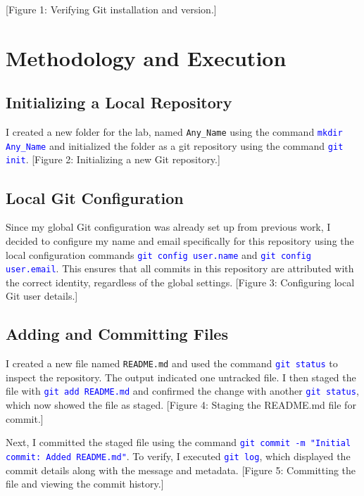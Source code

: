 \documentclass[10pt,a4paper]{report}
\newcommand{\command}[1]{\texttt{\textcolor{blue}{#1}}}
\begin{document}
[Figure 1: Verifying Git installation and version.]

\newpage
\section{Methodology and Execution}

\subsection{Initializing a Local Repository}
I created a new folder for the lab, named \texttt{Any\_Name} using the command \command{mkdir Any\_Name} and initialized the folder as a git repository using the command \command{git init}.
[Figure 2: Initializing a new Git repository.]


\subsection{Local Git Configuration}
Since my global Git configuration was already set up from previous work, I decided to configure my name and email specifically for this repository using the local configuration commands \command{git config user.name} and \command{git config user.email}. This ensures that all commits in this repository are attributed with the correct identity, regardless of the global settings.
[Figure 3: Configuring local Git user details.]

\subsection{Adding and Committing Files}
I created a new file named \texttt{README.md} and used the command \command{git status} to inspect the repository. The output indicated one untracked file. I then staged the file with \command{git add README.md} and confirmed the change with another \command{git status}, which now showed the file as staged.
[Figure 4: Staging the README.md file for commit.]

Next, I committed the staged file using the command \command{git commit -m "Initial commit: Added README.md"}. To verify, I executed \command{git log}, which displayed the commit details along with the message and metadata.
[Figure 5: Committing the file and viewing the commit history.]
\end{document}
